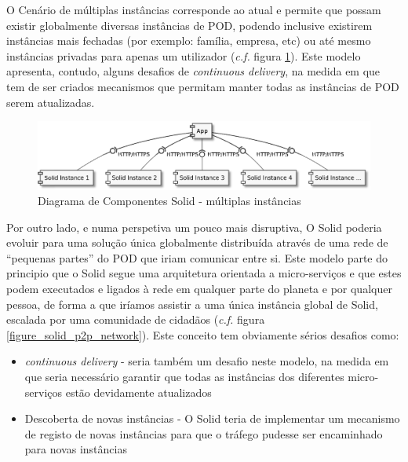 O Cenário de múltiplas instâncias corresponde ao atual e permite que possam existir globalmente diversas instâncias de POD, podendo inclusive existirem instâncias mais fechadas (por exemplo: família, empresa, etc) ou até mesmo instâncias privadas para apenas um utilizador (\emph{c.f.} figura \ref{figure_solid_multiple_instances}). Este modelo apresenta, contudo, alguns desafios de \emph{continuous delivery}, na medida em que tem de ser criados mecanismos que permitam manter todas as instâncias de POD serem atualizadas.

\begin{figure}[H]
    \begin{center}
    \includegraphics[width=1 \textwidth]{figures/solid_web1.eps}
    \caption{Diagrama de Componentes Solid - múltiplas instâncias}
    \label{figure_solid_multiple_instances}
    \end{center}
\end{figure}


Por outro lado, e numa perspetiva um pouco mais disruptiva, O Solid poderia evoluir para uma solução única globalmente distribuída através de uma rede de “pequenas partes” do POD que iriam comunicar entre si. Este modelo parte do principio que o Solid segue uma arquitetura orientada a micro-serviços e que estes podem executados e ligados à rede em qualquer parte do planeta e por qualquer pessoa, de forma a que iríamos assistir a uma única instância global de Solid, escalada por uma comunidade de cidadãos (\emph{c.f.} figura \ref{figure_solid_p2p_network}).
Este conceito tem obviamente sérios desafios como:
\begin{itemize}
    \item \emph{continuous delivery} - seria também um desafio neste modelo, na medida em que seria necessário garantir que todas as instâncias dos diferentes micro-serviços estão devidamente atualizados
    \item Descoberta de novas instâncias - O Solid teria de implementar um mecanismo de registo de novas instâncias para que o tráfego pudesse ser encaminhado para novas instâncias
\end{itemize}

